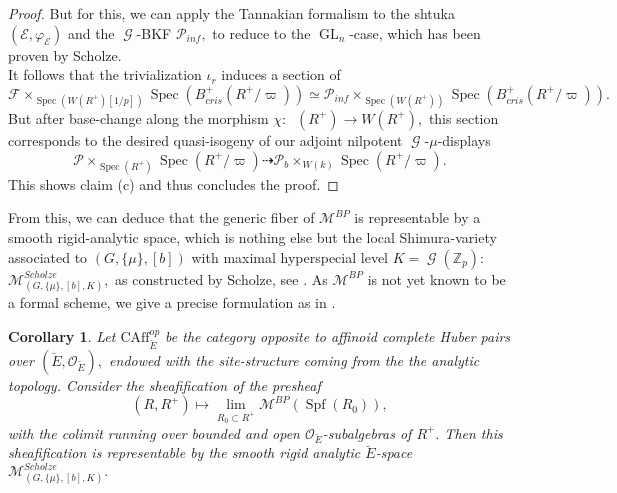 \documentclass[a4paper,10,5 pt]{amsart}
\newtheorem{Corollary}[Satz]{Corollary}
\theoremstyle{definition}
\DeclareMathOperator{\Spec}{Spec}
\DeclareMathOperator{\Spf}{Spf}
\DeclareMathOperator{\GL}{GL}
\DeclareMathOperator{\Acris}{\mathbb{A}_{cris}}
\DeclareMathOperator{\G}{\mathcal{G}}
\begin{document}
\begin{proof}
But for this, we can apply the Tannakian formalism to the shtuka $(\mathcal{E},\varphi_{\mathcal{E}})$ and the $\G$-BKF $\mathcal{P}_{inf},$ to reduce to the $\GL_{n}$-case, which has been proven by Scholze.
\\
It follows that the trivialization $\iota_{r}$ induces a section of
$$
\mathcal{F}\times_{\Spec(W(R^{+})[1/p])} \Spec(B^{+}_{cris}(R^{+}/\varpi))\simeq \mathcal{P}_{inf} \times_{\Spec(W(R^{+}))} \Spec(B^{+}_{cris}(R^{+}/\varpi)).
$$
But after base-change along the morphism $\chi\colon \Acris(R^{+})\rightarrow W(R^{+}),$ this section corresponds to the desired quasi-isogeny of our adjoint nilpotent $\G$-$\mu$-displays
$$
\mathcal{P}\times_{\Spec(R^{+})} \Spec(R^{+}/\varpi) \dashrightarrow \mathcal{P}_{b} \times_{W(k)} \Spec(R^{+}/\varpi).
$$
This shows claim (c) and thus concludes the proof.
\end{proof}
From this, we can deduce that the generic fiber of $\mathcal{M}^{BP}$ is representable by a smooth rigid-analytic space, which is nothing else but the local Shimura-variety associated to $(G,\lbrace \mu \rbrace,[b])$ with maximal hyperspecial level $K=\G(\mathbb{Z}_{p}):$ $\mathcal{M}^{Scholze}_{(G,\lbrace \mu \rbrace,[b],K)},$ as constructed by Scholze, see \cite[Definition 24.1.3.]{Berkeley lectures}. As $\mathcal{M}^{BP}$ is not yet known to be a formal scheme, we give a precise formulation as in \cite[Proposition 24.2.4.]{Berkeley lectures}.
\begin{Corollary}
Let $\text{CAff}^{op}_{\breve{E}}$ be the category opposite to affinoid complete Huber pairs over $(\breve{E},\mathcal{O}_{\breve{E}}),$ endowed with the site-structure coming from the the analytic topology. Consider the sheafification of the presheaf
$$
(R,R^{+})\mapsto \lim_{R_{0}\subset R^{+}} \mathcal{M}^{BP}(\Spf(R_{0})),
$$
with the colimit running over bounded and open $\mathcal{O}_{\breve{E}}$-subalgebras of $R^{+}.$ Then this sheafification is representable by the smooth rigid analytic $\breve{E}$-space $\mathcal{M}^{Scholze}_{(G,\lbrace \mu \rbrace,[b],K)}.$
\end{Corollary}
\newpage
\end{document}
